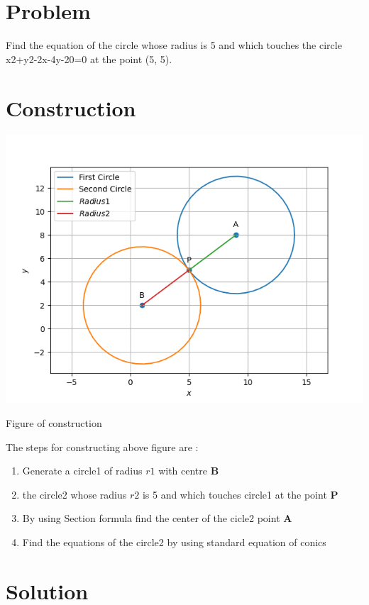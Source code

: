 \documentclass[10pt, a4paper]{article}
\title{\mytitle}
\author{\myauthor\hspace{1em}\\\contact\\FWC22032\hspace{6.5em}IITH\hspace{0.5em}\mymodule\hspace{6em}Assignment 5}
\let\vec\mathbf
\begin{document}
	\maketitle
	\tableofcontents
   \section{Problem}
Find the equation of the circle whose radius is 5 and which
touches the circle x2+y2-2x-4y-20=0 at the point (5, 5).
\section{Construction}
\includegraphics[scale=0.47]{fig.png}
\begin{center}
  Figure of construction
  	\end{center}
    The steps for constructing above figure are :
\begin{enumerate}
 \item Generate a circle1 of radius $r1$ with centre $\vec{B}$ 
 \item the circle2 whose radius  $r2$ is 5 and which touches circle1 at the point $\vec{P}$
 \item By using Section formula find the center of the cicle2 point $\vec{A}$
\item Find the equations of the circle2 by using standard equation of conics
\end{enumerate}

  	
  \section{Solution}
\end{document}
